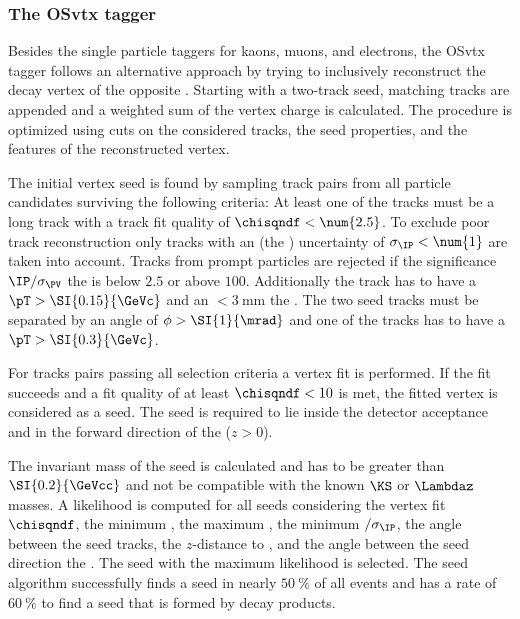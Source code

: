 \subsubsection{The \acl*{OSvtx} tagger}
\label{sec:flavour_tagging:os:vertex}

Besides the single particle taggers for kaons, muons, and electrons, the
\ac{OSvtx} tagger follows an alternative approach by trying to inclusively
reconstruct the decay vertex of the opposite \bhadron. Starting with a two-track
seed, matching tracks are appended and a weighted sum of the vertex charge is
calculated. The procedure is optimized using cuts on the considered tracks, the
seed properties, and the features of the reconstructed vertex.

The initial vertex seed is found by sampling track pairs from all particle
candidates surviving the following criteria: At least one of the tracks must be
a long track with a track fit quality of $\chisqndf<\num{2.5}$. To exclude poor
track reconstruction only tracks with an \IP (\wrt the \PV) uncertainty of
$\sigma_\text{\IP}<\num{1}$ are taken into account. Tracks from prompt particles
are rejected if the \IP significance $\text{\IP}/\sigma_\text{\PV}$ \wrt the \PV
is below $\num{2.5}$ or above $\num{100}$. Additionally the track has to have a
$\pT>\SI{0.15}{\GeVc}$ and an \IP$<\SI{3}{\milli\metre}$ \wrt the \PV. The
two seed tracks must be separated by an angle of $\phi>\SI{1}{\mrad}$ and one of
the tracks has to have a $\pT>\SI{0.3}{\GeVc}$.

For tracks pairs passing all selection criteria a vertex fit is performed. If
the fit succeeds and a fit quality of at least $\chisqndf<10$ is met, the fitted
vertex is considered as a seed. The seed is required to lie inside the detector
acceptance and in the forward direction of the \PV ($z>0$). 

The invariant mass of the seed is calculated and has to be greater than
$\SI{0.2}{\GeVcc}$ and not be compatible with the known $\KS$ or $\Lambdaz$
masses. %
A likelihood is computed for all seeds considering the vertex fit $\chisqndf$,
the minimum \pT, the maximum \PV \IP, the minimum \PV \IP$/\sigma_\text{\IP}$,
the angle between the seed tracks, the $z$-distance to \PV, and the angle
between the seed direction \wrt the \PV. The seed with the maximum likelihood
is selected. The seed algorithm successfully finds a seed in nearly
$\SI{50}{\percent}$ of all events and has a rate of $\SI{60}{\percent}$ to find
a seed that is formed by \bhadron decay products.

